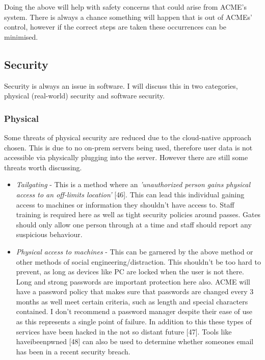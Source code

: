   Doing the above will help with safety concerns that could arise from ACME's system. There is always a chance something will happen that is out of 
  ACMEs' control, however if the correct steps are taken these occurrences can be minimised.

  \subsection{Security}
  Security is always an issue in software. I will discuss this in two categories, physical (real-world) security and software security.

  \subsubsection{Physical}
  \vspace{0.2cm}
  Some threats of physical security are reduced due to the cloud-native approach chosen. This is due to no on-prem servers being used, therefore 
  user data is not accessible via physically plugging into the server. However there are still some threats worth discussing.

  \begin{itemize}
    \item \textit{Tailgating} - This is a method where an \textit{'unauthorized person gains physical access to an off-limits location'} [46]. This can 
    lead this individual gaining access to machines or information they shouldn't have access to. Staff training is required here as well as tight security
    policies around passes. Gates should only allow one person through at a time and staff should report any suspicious behaviour.

    \item \textit{Physical access to machines} - This can be garnered by the above method or other methods of social engineering/distraction. This shouldn't
    be too hard to prevent, as long as devices like PC are locked when the user is not there. Long and strong passwords are important protection here also.
    ACME will have a password policy that makes sure that passwords are changed every 3 months as well meet certain criteria, such as length and special
    characters contained. I don't recommend a password manager despite their ease of use as this represents a single point of failure. In addition to this
    these types of services have been hacked in the not so distant future [47]. Tools like haveibeenpwned [48] can also be used to determine whether someones
    email has been in a recent security breach.
  
  \end{itemize}

